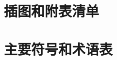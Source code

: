 \documentclass{caugraduatethesis}
\renewcommand{\listfigurename}{插图}
\renewcommand{\listtablename}{附表}
\begin{document}
    \setcounter{tocdepth}{2} %
    \tableofcontents

    \newpage
    \section*{插图和附表清单}
    \begin{listoffigtbl}
    \newcommand{\loflabel}{图}
    \renewcommand{\numberline}[1]{\loflabel~#1\hspace*{1em}}
    \listoffigures
    \nobreak
    \nopagebreak
    \newcommand{\lotlabel}{表}
    \renewcommand{\numberline}[1]{\lotlabel~#1\hspace*{1em}}
    \listoftables
    \end{listoffigtbl}

    \newpage
    \section*{主要符号和术语表}
\end{document}
